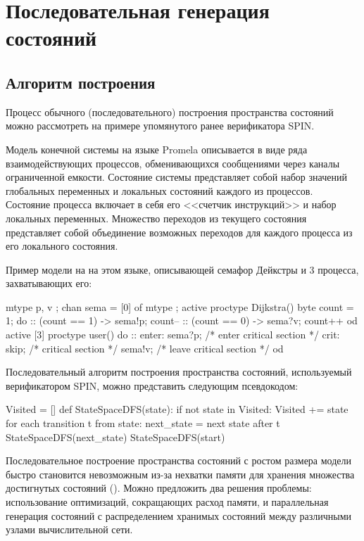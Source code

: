 \chapter{Последовательная генерация состояний}
\label{sec:seq-statespace}

\section{Алгоритм построения}
\label{sec:seq-algo}

Процесс обычного (последовательного) построения пространства состояний
можно рассмотреть на примере упомянутого ранее верификатора SPIN.

Модель конечной системы на языке Promela описывается в виде ряда
взаимодействующих процессов, обменивающихся сообщениями через каналы
ограниченной емкости. Состояние системы представляет собой набор
значений глобальных переменных и локальных состояний каждого из
процессов. Состояние процесса включает в себя его <<счетчик инструкций>>
и набор локальных переменных. Множество переходов из текущего
состояния представляет собой объединение возможных переходов для
каждого процесса из его локального состояния.

Пример модели на на этом языке, описывающей семафор Дейкстры и 3
процесса, захватывающих его:

\begin{CodeBlock}
mtype { p, v };
chan sema = [0] of { mtype };
active proctype Dijkstra()
{      byte count = 1;
       do
       :: (count == 1) ->
               sema!p; count--
       :: (count == 0) ->
               sema?v; count++
       od
}
active [3] proctype user()
{       do
        :: enter: sema?p; /* enter critical section */
            crit: skip;   /* critical section */
                  sema!v; /* leave critical section */
        od
}
\end{CodeBlock}

Последовательный алгоритм построения пространства состояний,
используемый верификатором SPIN, можно представить следующим
псевдокодом:

\begin{CodeBlock}
Visited = []
def StateSpaceDFS(state):
    if not state in Visited:
        Visited += state
        for each transition t from state:
            next_state = next state after t
            StateSpaceDFS(next_state)
StateSpaceDFS(start)
\end{CodeBlock}

Последовательное построение пространства состояний с ростом размера
модели быстро становится невозможным из-за нехватки памяти для
хранения множества достигнутых состояний (). Можно предложить
два решения проблемы: использование оптимизаций, сокращающих расход
памяти, и параллельная генерация состояний с распределением хранимых
состояний между различными узлами вычислительной сети.

